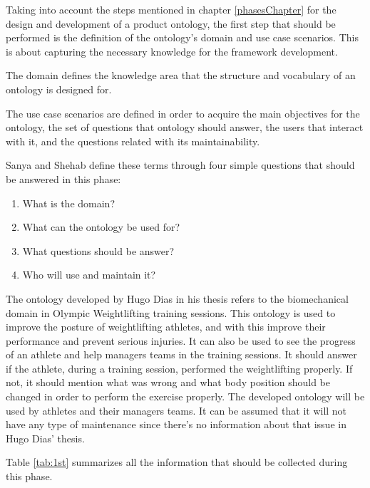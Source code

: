 Taking into account the steps mentioned in chapter \ref{phasesChapter} for the design and development of a product ontology, the first step that should be performed is the definition of the ontology's domain and use case scenarios. This is about capturing the necessary knowledge for the framework development.
\par The domain defines the knowledge area that the structure and vocabulary of an ontology is designed for.
\par The use case scenarios are defined in order to acquire the main objectives for the ontology, the set of questions that ontology should answer, the users that interact with it, and the questions related with its maintainability.
\par Sanya and Shehab \cite{AeroArticle} define these terms through four simple questions that should be answered in this phase:
\begin{enumerate}
\item What is the domain?
\item What can the ontology be used for?
\item What questions should be answer?
\item Who will use and maintain it?
\end{enumerate}

\par The ontology developed by Hugo Dias \cite{HugoThesis} in his thesis refers to the biomechanical domain in Olympic Weightlifting training sessions.
This ontology is used to improve the posture of weightlifting athletes, and with this improve their performance and prevent serious injuries. It can also be used to see the progress of an athlete and help managers teams in the training sessions.
It should answer if the athlete, during a training session, performed the weightlifting properly. If not, it should mention what was wrong and what body position should be changed in order to perform the exercise properly.
The developed ontology will be used by athletes and their managers teams. It can be assumed that it will not have any type of maintenance since there's no information about that issue in Hugo Dias' \cite{HugoThesis} thesis. 
\par Table \ref{tab:1st} summarizes all the information that should be collected during this phase. 

